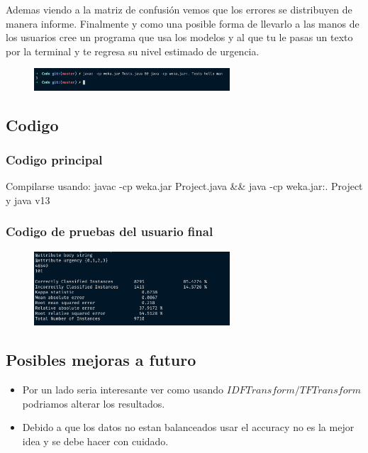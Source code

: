 \documentclass[12pt, fleqn]{report}                             %
\theoremstyle{break}                                            %
\begin{document}
        Ademas viendo a la matriz de confusión vemos que los errores se distribuyen de manera informe.
        Finalmente y como una posible forma de llevarlo a las manos de los usuarios cree un programa que usa
        los modelos y al que tu le pasas un texto por la terminal y te regresa su nivel estimado de urgencia.

        \begin{figure}[h!]
            \centering
            \includegraphics[width=0.65\textwidth]{man}
        \end{figure}

        \subsection{Codigo}
        \subsubsection{Codigo principal}
        Compilarse usando: javac -cp weka.jar Project.java \&\& java -cp weka.jar:. Project   
        y java v13
        

        \subsubsection{Codigo de pruebas del usuario final}
        \begin{figure}[h!]
            \centering
            \includegraphics[width=0.65\textwidth]{result}
        \end{figure}
        



        \subsection{Posibles mejoras a futuro}

            \begin{itemize}
                \item Por un lado seria interesante ver como usando $IDFTransform/TFTransform$
                podriamos alterar los resultados.
                \item Debido a que los datos no estan balanceados usar el accuracy no es la mejor
                idea y se debe hacer con cuidado.
            \end{itemize}
\end{document}
